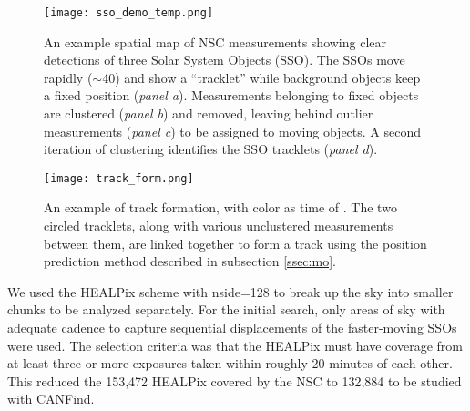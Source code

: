 \documentclass[twocolumn]{aastex62}
\begin{document}
\begin{figure*}[t]
\centering
\texttt{[image: sso\_demo\_temp.png]}
\caption{An example spatial map of NSC measurements showing clear detections of three Solar System Objects (SSO).  The SSOs move rapidly ($\sim$40\arh  {}) and show a ``tracklet'' while background objects keep a fixed position ({\em panel a}).  Measurements belonging to fixed objects are clustered ({\em panel b}) and removed, leaving behind outlier measurements ({\em panel c}) to be assigned to moving objects.  A second iteration of clustering identifies the SSO tracklets ({\em panel d}).}
\label{fig:sso_demo}
\end{figure*}

\begin{figure}
\centering
\texttt{[image: track\_form.png]}
\caption{An example of track formation, with color as time of .  The two circled tracklets, along with various unclustered measurements between them, are linked together to form a track using the position prediction method described in subsection \ref{ssec:mo}.}
\label{track_form}
\end{figure}

We used the HEALPix scheme with nside=128 to break up the sky into smaller chunks to be analyzed separately. For the initial search, only areas of sky with adequate cadence to capture sequential displacements of the faster-moving SSOs were used.  The selection criteria was that the HEALPix must have coverage from at least three or more exposures taken within roughly 20 minutes of each other.  This reduced the 153,472 HEALPix covered by the NSC to 132,884 to be studied with CANFind.
\end{document}
